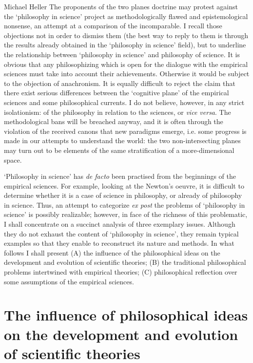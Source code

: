 \begin{artengenv}{Michael Heller}
The proponents of the two planes doctrine may protest against the `philosophy in science' project as
methodologically flawed and epistemological nonsense, an attempt at a comparison of the incomparable. I recall those
objections not in order to dismiss them (the best way to reply to them is through the results already obtained in the
`philosophy in science' field), but to underline the relationship between `philosophy in science' and philosophy of
science. It is obvious that any philosophizing which is open for the dialogue with the empirical sciences must take
into account their achievements. Otherwise it would be subject to the objection of anachronism. It is equally difficult
to reject the claim that there exist serious differences between the `cognitive plane' of the empirical sciences and
some philosophical currents. I do not believe, however, in any strict isolationism: of the philosophy in relation to
the sciences, or \textit{vice versa}. The methodological bans will be breached anyway, and it is often through the
violation of the received canons that new paradigms emerge, i.e. some progress is made in our attempts to understand
the world: the two non-intersecting planes may turn out to be elements of the same stratification of a more-dimensional
space.

`Philosophy in science' has \textit{de facto} been practised from the beginnings of the empirical sciences. For
example, looking at the Newton's oeuvre, it is difficult to determine whether it is a case of science in philosophy, or
already of philosophy in science.\label{heller-newton} Thus, an attempt to categorize \textit{ex post }the problems of `philosophy in
science' is possibly realizable; however, in face of the richness of this problematic, I shall concentrate on a
succinct analysis of three exemplary issues. Although they do not exhaust the content of `philosophy in science', they
remain typical examples so that they enable to reconstruct its nature and methods. In what follows I shall present (A)
the influence of the philosophical ideas on the development and evolution of scientific theories; (B) the traditional
philosophical problems intertwined with empirical theories; (C) philosophical reflection over some assumptions of the
empirical sciences.\label{heller-three-points}


\section{The influence of philosophical ideas on the development and evolution of scientific theories}



\end{artengenv}
